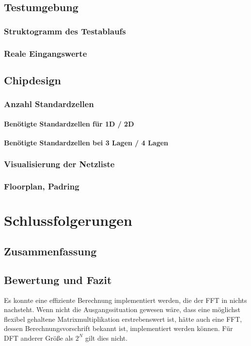  \section{Testumgebung}
 \subsection{Struktogramm des Testablaufs}
 \subsection{Reale Eingangswerte}
 
 \section{Chipdesign}
 \subsection{Anzahl Standardzellen}
 \subsubsection{Benötigte Standardzellen für 1D / 2D}
 \subsubsection{Benötigte Standardzellen bei 3 Lagen / 4 Lagen}
 \subsection{Visualisierung der Netzliste}
 \subsection{Floorplan, Padring}
 
 \chapter{Schlussfolgerungen}
 \section{Zusammenfassung}
 \section{Bewertung und Fazit}
 Es konnte eine effiziente Berechnung implementiert werden, die der FFT in nichts nachsteht. Wenn nicht die Ausgangssituation gewesen wäre, dass eine möglichst flexibel gehaltene
 Matrixmultiplikation erstrebenswert ist, hätte auch eine FFT, dessen Berechnungsvorschrift bekannt ist, implementiert werden können. Für DFT anderer Größe als $2^N$ gilt dies nicht.
 
